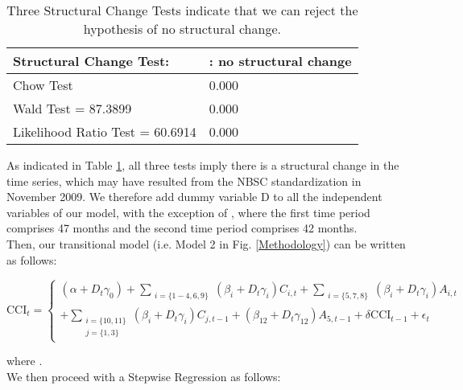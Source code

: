 \documentclass[10pt]{article}
\begin{document}
\begin {table}
\begin {center}
\begin {tabular} {ll}
\hline
Structural Change Test:  	&	: no structural change	\\
\hline
Chow Test 	                         &	   0.000	\\
Wald Test = 87.3899	                                                  &	    0.000	\\
Likelihood Ratio Test = 60.6914	                                 &	    0.000	\\
\hline
\end {tabular}
\caption{\label {SCT_results}Three Structural Change Tests indicate that we can reject the hypothesis of no structural change.}
\end {center}
\end {table}



As indicated in Table \ref{SCT_results}, all three tests imply there is a structural change in the time series, which may have resulted from the NBSC standardization in November 2009.
We therefore add dummy variable D to all the independent variables of our model, with the exception of , where the first time period comprises 47 months and the second time period comprises 42 months.\\

 


Then, our transitional model (i.e. Model 2 in Fig. \ref{Methodology}) can be written as follows:

\begin {equation}
\mbox{CCI}_t=
\begin{cases}
 (\alpha+D_t\gamma_0) +  \sum_{\substack{i=\{1-4, 6,9\}}} (\beta_i + D_t\gamma_i) C_{i,t} + \sum_{\substack{i=\{5,7,8\}}} (\beta_i + D_t\gamma_i) A_{i,t}\\
 + \sum_{\substack{i=\{10,11\}\\
			      j=\{1,3\}}} (\beta_i + D_t \gamma_i)C_{j,t-1} + (\beta_{12} + D_t \gamma_{12})A_{5,t-1} + \delta \mbox{CCI}_{t-1}+ \epsilon_t
\end{cases}
\label{model}
\end {equation}


 where .\\
  
We then proceed with a Stepwise Regression \cite{Draper1998} as follows: \\
 
\end{document}
